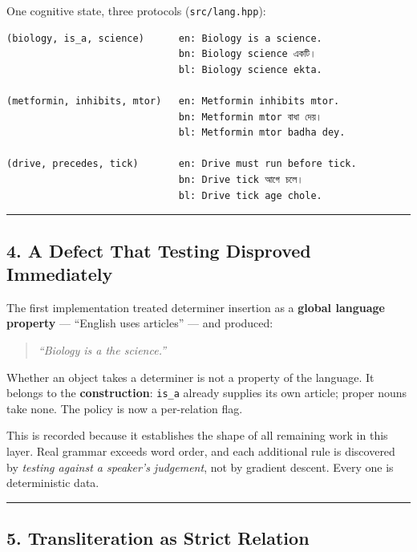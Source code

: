 \documentclass[
  11pt,
  a4paper,
]{article}
\begin{document}
One cognitive state, three protocols (\texttt{src/lang.hpp}):

\begin{verbatim}
(biology, is_a, science)      en: Biology is a science.
                              bn: Biology science একটি।
                              bl: Biology science ekta.

(metformin, inhibits, mtor)   en: Metformin inhibits mtor.
                              bn: Metformin mtor বাধা দেয়।
                              bl: Metformin mtor badha dey.

(drive, precedes, tick)       en: Drive must run before tick.
                              bn: Drive tick আগে চলে।
                              bl: Drive tick age chole.
\end{verbatim}

\begin{center}\rule{0.5\linewidth}{0.5pt}\end{center}

\subsection{4. A Defect That Testing Disproved
Immediately}\label{a-defect-that-testing-disproved-immediately}

The first implementation treated determiner insertion as a
\textbf{global language property} --- ``English uses articles'' --- and
produced:

\begin{quote}
\emph{``Biology is a the science.''}
\end{quote}

Whether an object takes a determiner is not a property of the language.
It belongs to the \textbf{construction}: \texttt{is\_a} already supplies
its own article; proper nouns take none. The policy is now a
per-relation flag.

This is recorded because it establishes the shape of all remaining work
in this layer. Real grammar exceeds word order, and each additional rule
is discovered by \emph{testing against a speaker's judgement}, not by
gradient descent. Every one is deterministic data.

\begin{center}\rule{0.5\linewidth}{0.5pt}\end{center}

\subsection{5. Transliteration as Strict
Relation}\label{transliteration-as-strict-relation}
\end{document}
